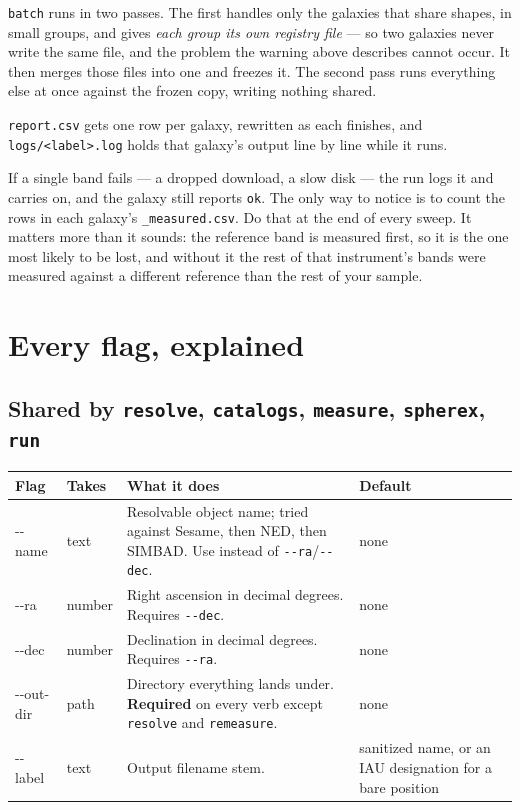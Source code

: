 \documentclass[11pt]{article}
\begin{document}
\texttt{batch} runs in two passes. The first handles only the galaxies that
share shapes, in small groups, and gives \emph{each group its own registry
file} --- so two galaxies never write the same file, and the problem the
warning above describes cannot occur. It then merges those files into one
and freezes it. The second pass runs everything else at once against the
frozen copy, writing nothing shared.

\texttt{report.csv} gets one row per galaxy, rewritten as each finishes, and
\texttt{logs/<label>.log} holds that galaxy's output line by line while it
runs.

\begin{warnbox}
If a single band fails --- a dropped download, a slow disk --- the run logs
it and carries on, and the galaxy still reports \texttt{ok}. The only way to
notice is to count the rows in each galaxy's \texttt{\_measured.csv}. Do
that at the end of every sweep. It matters more than it sounds: the
reference band is measured first, so it is the one most likely to be lost,
and without it the rest of that instrument's bands were measured against a
different reference than the rest of your sample.
\end{warnbox}

\section{Every flag, explained}

\subsection{Shared by \texttt{resolve}, \texttt{catalogs},
\texttt{measure}, \texttt{spherex}, \texttt{run}}

\begin{longtable}{T{2.9cm} L{2.15cm} L{6.45cm} L{2.7cm}}
\toprule
\textbf{\normalfont Flag} & \textbf{Takes} & \textbf{What it does} & \textbf{Default} \\
\midrule
\endhead
-{}-name & text & Resolvable object name; tried against Sesame, then NED,
  then SIMBAD. Use instead of \texttt{-{}-ra}/\texttt{-{}-dec}. & none \\[2pt]
-{}-ra & number & Right ascension in decimal degrees. Requires
  \texttt{-{}-dec}. & none \\[2pt]
-{}-dec & number & Declination in decimal degrees. Requires
  \texttt{-{}-ra}. & none \\[2pt]
-{}-out-dir & path & Directory everything lands under. \textbf{Required}
  on every verb except \texttt{resolve} and \texttt{remeasure}. & none \\[2pt]
-{}-label & text & Output filename stem. & sanitized name, or an IAU
  designation for a bare position \\
\bottomrule
\end{longtable}
\end{document}
